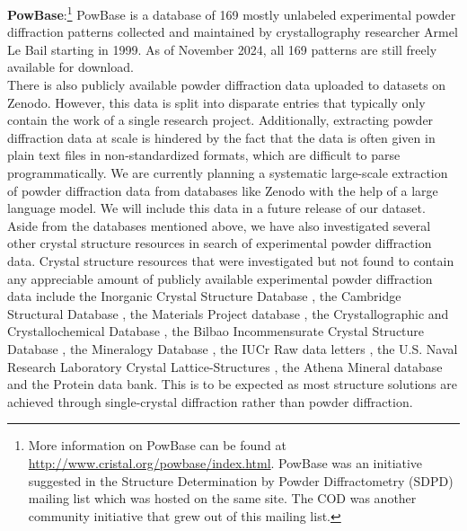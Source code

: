 \textbf{PowBase}:\footnote{More information on PowBase can be found at \url{http://www.cristal.org/powbase/index.html}. PowBase was an initiative suggested in the Structure Determination by Powder Diffractometry (SDPD) mailing list which was hosted on the same site. The COD was another community initiative that grew out of this mailing list.} PowBase is a database of 169 mostly unlabeled experimental powder diffraction patterns collected and maintained by crystallography researcher Armel Le Bail starting in 1999. As of November 2024, all 169 patterns are still freely available for download. \\

There is also publicly available powder diffraction data uploaded to datasets on Zenodo. However, this data is split into disparate entries that typically only contain the work of a single research project. Additionally, extracting powder diffraction data at scale is hindered by the fact that the data is often given in plain text files in non-standardized formats, which are difficult to parse programmatically. We are currently planning a systematic large-scale extraction of powder diffraction data from databases like Zenodo with the help of a large language model. We will include this data in a future release of our dataset.\\

Aside from the databases mentioned above, we have also investigated several other crystal structure resources in search of experimental powder diffraction data. Crystal structure resources that were investigated but not found to contain any appreciable amount of publicly available experimental powder diffraction data include the Inorganic Crystal Structure Database \cite{ICSDWeb}, the Cambridge Structural Database \cite{CambridgeWeb}, the Materials Project database \cite{MatProjWeb}, the Crystallographic and Crystallochemical Database \cite{CrystallochemicalWeb}, the Bilbao Incommensurate Crystal Structure Database \cite{BilbaoWeb}, the Mineralogy Database \cite{MineralogyWeb}, the IUCr Raw data letters \cite{IUCrWeb}, the U.S. Naval Research Laboratory Crystal Lattice-Structures \cite{NRLWeb}, the Athena Mineral database \cite{AthenaWeb} and the Protein data bank\cite{PDBWeb}. This is to be expected as most structure solutions are achieved through single-crystal diffraction rather than powder diffraction. \\ 